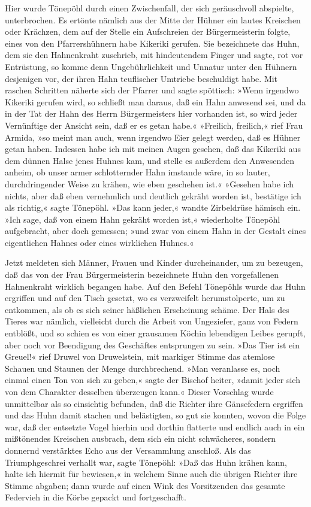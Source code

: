 Hier wurde Tönepöhl durch einen Zwischenfall, der sich geräuschvoll
abspielte, unterbrochen. Es ertönte nämlich aus der Mitte der
Hühner ein lautes Kreischen oder Krächzen, dem auf der Stelle ein
Aufschreien der Bürgermeisterin folgte, eines von den
Pfarrershühnern habe Kikeriki gerufen. Sie bezeichnete das Huhn,
dem sie den Hahnenkraht zuschrieb, mit hindeutendem Finger und
sagte, rot vor Entrüstung, so komme denn Ungebührlichkeit und
Unnatur unter den Hühnern desjenigen vor, der ihren Hahn
teuflischer Umtriebe beschuldigt habe. Mit raschen Schritten
näherte sich der Pfarrer und sagte spöttisch: »Wenn irgendwo
Kikeriki gerufen wird, so schließt man daraus, daß ein Hahn
anwesend sei, und da in der Tat der Hahn des Herrn Bürgermeisters
hier vorhanden ist, so wird jeder Vernünftige der Ansicht sein, daß
\pagenum{[49]} er es getan habe.« »Freilich, freilich,« rief Frau
Armida, »so meint man auch, wenn irgendwo Eier gelegt werden, daß
es Hühner getan haben. Indessen habe ich mit meinen Augen gesehen,
daß das Kikeriki aus dem dünnen Halse jenes Huhnes kam, und stelle
es außerdem den Anwesenden anheim, ob unser armer schlotternder
Hahn imstande wäre, in so lauter, durchdringender Weise zu krähen,
wie eben geschehen ist.« »Gesehen habe ich nichts, aber daß eben
vernehmlich und deutlich gekräht worden ist, bestätige ich als
richtig,« sagte Tönepöhl. »Das kann jeder,« wandte Zirbeldrüse
hämisch ein. »Ich sage, daß von einem Hahn gekräht worden ist,«
wiederholte Tönepöhl aufgebracht, aber doch gemessen; »und zwar von
einem Hahn in der Gestalt eines eigentlichen Hahnes oder eines
wirklichen Huhnes.«

Jetzt meldeten sich Männer, Frauen und Kinder durcheinander, um zu
bezeugen, daß das von der Frau Bürgermeisterin bezeichnete Huhn den
vorgefallenen Hahnenkraht wirklich begangen habe. Auf den Befehl
Tönepöhls wurde das Huhn ergriffen und auf den Tisch gesetzt, wo es
verzweifelt herumstolperte, um zu entkommen, als ob es sich seiner
häßlichen Erscheinung schäme. Der Hals des Tieres war nämlich,
vielleicht durch die Arbeit von Ungeziefer, ganz von Federn
entblößt, und so schien es von einer grausamen Köchin lebendigen
Leibes gerupft, aber noch vor Beendigung des Geschäftes entsprungen
zu sein. »Das Tier ist ein Greuel!« rief Druwel von Druwelstein,
mit markiger Stimme das atemlose Schauen und Staunen der Menge
durchbrechend. »Man veranlasse es, noch einmal einen Ton von sich
zu geben,« sagte der Bischof heiter, »damit jeder sich von dem
Charakter desselben überzeugen kann.« Dieser Vorschlag wurde
unmittelbar als so einsichtig befunden, daß die Richter
\pagenum{[50]} ihre Gänsefedern ergriffen und das Huhn damit
stachen und belästigten, so gut sie konnten, wovon die Folge war,
daß der entsetzte Vogel hierhin und dorthin flatterte und endlich
auch in ein mißtönendes Kreischen ausbrach, dem sich ein nicht
schwächeres, sondern donnernd verstärktes Echo aus der Versammlung
anschloß. Als das Triumphgeschrei verhallt war, sagte Tönepöhl:
»Daß das Huhn krähen kann, halte ich hiermit für bewiesen,« in
welchem Sinne auch die übrigen Richter ihre Stimme abgaben; dann
wurde auf einen Wink des Vorsitzenden das gesamte Federvieh in die
Körbe gepackt und fortgeschafft.

